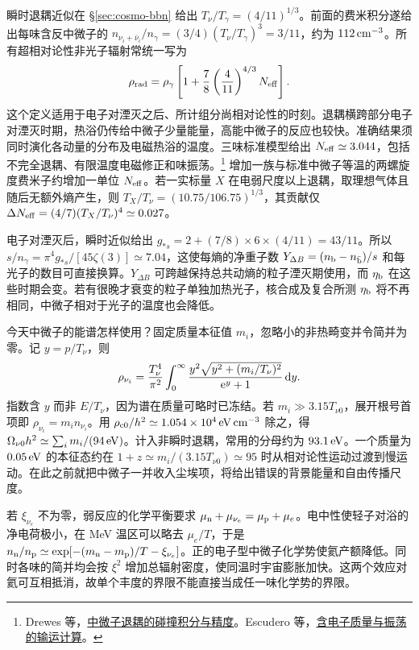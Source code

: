 瞬时退耦近似在 \S\ref{sec:cosmo-bbn} 给出 $T_\nu/T_\gamma=(4/11)^{1/3}$。前面的费米积分遂给出每味含反中微子的 $n_{\nu_i+\bar\nu_i}/n_\gamma=(3/4)(T_\nu/T_\gamma)^3=3/11$，约为 $112\,{\rm cm}^{-3}$。所有超相对论性非光子辐射常统一写为
\begin{equation}\label{eq:cosmo-neff-thermal}
 \rho_{\rm rad}=\rho_\gamma\left[1+\frac78
  \left(\frac{4}{11}\right)^{4/3} N_{\rm eff}\right] .
\end{equation}
这个定义适用于电子对湮灭之后、所计组分尚相对论性的时刻。退耦横跨部分电子对湮灭时期，热浴仍传给中微子少量能量，高能中微子的反应也较快。准确结果须同时演化各动量的分布及电磁热浴的温度。三味标准模型给出 $N_{\rm eff}\simeq3.044$，包括不完全退耦、有限温度电磁修正和味振荡。\footnote{Drewes 等，\href{https://arxiv.org/abs/2402.18481}{中微子退耦的碰撞积分与精度}。Escudero 等，\href{https://arxiv.org/abs/2511.04747}{含电子质量与振荡的输运计算}。} 增加一族与标准中微子等温的两螺旋度费米子约增加一单位 $N_{\rm eff}$。若一实标量 $X$ 在电弱尺度以上退耦，取理想气体且随后无额外熵产生，则 $T_X/T_\nu=(10.75/106.75)^{1/3}$，其贡献仅 $\Delta N_{\rm eff}=(4/7)(T_X/T_\nu)^4\simeq0.027$。

电子对湮灭后，瞬时近似给出 $g_{*s}=2+(7/8)\times6\times(4/11)=43/11$。所以 $s/n_\gamma=\pi^4g_{*s}/[45\zeta(3)]\simeq7.04$，这使每熵的净重子数 $Y_{\Delta B}=(n_{\rm b}-n_{\bar{\rm b}})/s$ 和每光子的数目可直接换算。$Y_{\Delta B}$ 可跨越保持总共动熵的粒子湮灭期使用，而 $\eta_{\rm b}$ 在这些时期会变。若有很晚才衰变的粒子单独加热光子，核合成及复合所测 $\eta_{\rm b}$ 将不再相同，中微子相对于光子的温度也会降低。

今天中微子的能谱怎样使用？固定质量本征值 $m_i$，忽略小的非热畸变并令简并为零。记 $y=p/T_\nu$，则
\[
 \rho_{\nu_i}=\frac{T_\nu^4}{\pi^2}\int_0^\infty
 \frac{y^2\sqrt{y^2+(m_i/T_\nu)^2}}{\mathrm{e}^y+1}\,\dd y .
\]
指数含 $y$ 而非 $E/T_\nu$，因为谱在质量可略时已冻结。若 $m_i\gg3.15T_{\nu0}$，展开根号首项即 $\rho_{\nu_i}=m_i n_{\nu_i}$。用 $\rho_{{\rm c}0}/h^2\simeq1.054\times10^4\,{\rm eV\,cm^{-3}}$ 除之，得 $\Omega_{\nu0}h^2\simeq\sum_i m_i/(94\,{\rm eV})$。计入非瞬时退耦，常用的分母约为 $93.1\,{\rm eV}$。一个质量为 $0.05\,{\rm eV}$ 的本征态约在 $1+z\simeq m_i/(3.15T_{\nu0})\simeq95$ 时从相对论性运动过渡到慢运动。在此之前就把中微子一并收入尘埃项，将给出错误的背景能量和自由传播尺度。

若 $\xi_{\nu_e}$ 不为零，弱反应的化学平衡要求 $\mu_{\rm n}+\mu_{\nu_e}=\mu_{\rm p}+\mu_e$。电中性使轻子对浴的净电荷极小，在 MeV 温区可以略去 $\mu_e/T$，于是 $n_{\rm n}/n_{\rm p}\simeq\exp[-(m_{\rm n}-m_{\rm p})/T-\xi_{\nu_e}]$。正的电子型中微子化学势使氦产额降低。同时各味的简并均会按 $\xi^2$ 增加总辐射密度，使同温时宇宙膨胀加快。这两个效应对氦可互相抵消，故单个丰度的界限不能直接当成任一味化学势的界限。

